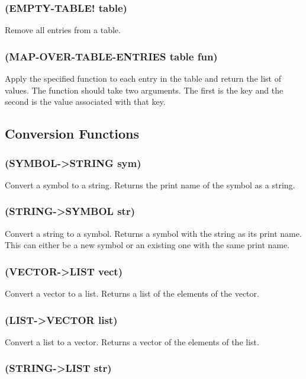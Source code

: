 \documentclass[11pt]{article}
\begin{document}
\subsubsection{(EMPTY-TABLE! table)}
\label{sec-4-20-5}

Remove all entries from a table.
\subsubsection{(MAP-OVER-TABLE-ENTRIES table fun)}
\label{sec-4-20-6}

Apply the specified function to each entry in the table and return
the list of values.  The function should take two arguments.  The
first is the key and the second is the value associated with that
key.
\subsection{Conversion Functions}
\label{sec-4-21}

\subsubsection{(SYMBOL->STRING sym)}
\label{sec-4-21-1}

Convert a symbol to a string.  Returns the print name of the symbol
as a string.
\subsubsection{(STRING->SYMBOL str)}
\label{sec-4-21-2}

Convert a string to a symbol.  Returns a symbol with the string as
its print name.  This can either be a new symbol or an existing one
with the same print name.
\subsubsection{(VECTOR->LIST vect)}
\label{sec-4-21-3}

Convert a vector to a list.  Returns a list of the elements of the
vector.
\subsubsection{(LIST->VECTOR list)}
\label{sec-4-21-4}

Convert a list to a vector.  Returns a vector of the elements of the
list.
\subsubsection{(STRING->LIST str)}
\label{sec-4-21-5}
\end{document}
